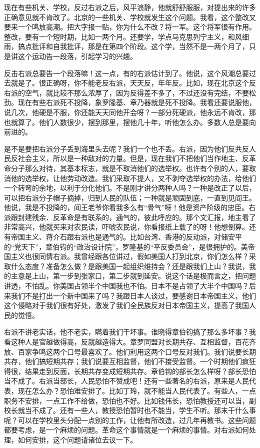 现在有些机关、学校，反过右派之后，风平浪静，他就舒舒服服，对提出来的许多正确意见就不肯改了。北京的一些机关、学校就发生这个问题。我看，这个整改又要来一个鸣放高潮。把大字报一贴，你为什么不改？将一军。这个将军很有作用。整改，要有一个短时期，比如一两个月。还要学，学点马克思列宁主义，和风细雨，搞点批评和自我批评，那是在第四个阶段。这个学，当然不是一两个月了，只是讲这个运动告一段落，引起学习的兴趣。

反击右派总要告一个段落嘛！这一点，有的右派估计到了。他说，这个风潮总要过去就是了。很正确呀，你不能老反右派，天天反，年年反。比如，现在北京这个反右派的空气，就比较不那么浓厚了，因为反得差不多了，不过还没有完结，不要松劲。现在有些右派死不投降，象罗隆基、章乃器就是死不投降。我看还要说服他，说几次，他硬是不服，你还能天天同他开会呀？一部分死硬派，他永远不肯改，那也就算了。他们人数很少，摆到那里，摆他几十年，听他怎么办。多数人总是要向前进的。

是不是要把右派分子丢到海里头去呢？我们一个也不丢。右派，因为他们反共反人民反社会主义，所以是一种敌对的力量。但是，现在我们不把他们当作地主、反革命分子那么对待，其基本标志，就是不取消他们的选举权。也许有个别的人，要取消他的选举权，让他劳动改造。我们采取不提人，又不剥夺选举权的办法，给他们一个转弯的余地，以利于分化他们。不是刚才讲分两种人吗？一种是改正了以后，可以把右派分子帽子摘掉，归到人民的队伍；一种就是顽固到底，一直到见阎王。他说，我是不投降的，阎王老爷你看我多么有“骨气”呀！他是资产阶级的忠臣。右派跟封建残余、反革命是有联系的，通气的，彼此呼应的。那个文汇报，地主看了非常高兴，他就买来对农民读，吓唬农民说，你看报纸上载了的呀！他想倒算。还有帝国主义、蒋介石跟右派也是通气的。比如台湾、香港的反动派，对储安平的“党天下”，章伯钧的“政治设计院”，罗隆基的“平反委员会”，是很拥护的。美帝国主义也很同情右派。我曾经跟各位讲过，假如美国人打到北京，你们怎么样？采取什么态度？准备怎么做？是跟美国一起组织维持会？还是跟我们上山？我说，我的主意是上山，第一步到张家口，第二步就到延安。说这个话是极而言之，把问题讲透，不怕乱。你美国占领半个中国我也不怕。日本不是占领了大半个中国吗？后来我们不是打出一个新中国来了吗？我跟日本人谈过，要感谢日本帝国主义，他们这个侵略对于我们很有好处，激发了我们全民族反对日本帝国主义，提高了我国人民的觉悟。

右派不讲老实话，他不老实，瞒着我们干坏事。谁晓得章伯钧搞了那么多坏事？我看这种人是官越做得高，反就越造得大。章罗同盟对长期共存、互相监督，百花齐放、百家争鸣这两个口号最喜欢了。他们利用这两个口号反对我们。我们说要长期共存，他们搞短期共存；我们说要互相监督，他们不接受监督。一个时期他们疯狂得很，结果走到反面，长期共存变成短期共存。章伯钩的部长怎么样呀？部长恐怕当不成了。右派当部长，人民恐怕不赞成吧！还有一些著名的右派，原来是人民代表，现在怎么办？恐怕难安排了。比如丁玲，就不能当人民代表了。有些人，一点职务不安排，一点工作不给做，恐怕也不好。比如钱伟长，恐怕教授还可以当，副校长就当不成了。还有一些人，教授恐怕暂时也不能当，学生不听。那末干什么事呢？可以在学校里头分配一点别的工作，让他有所改造，过几年再教书。这些问题都要考虑，是一个麻烦的问题。革命这个事情就是一个麻烦的事情。对右派如何处理，如何安排，这个问题请诸位去议一下。

